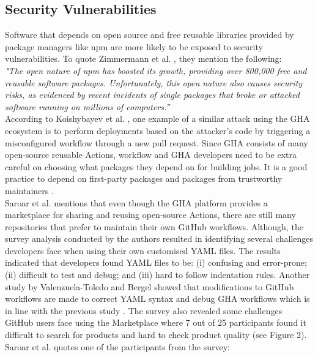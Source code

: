 \documentclass[conference]{IEEEtran}
\begin{document}
    \subsection{Security Vulnerabilities}
        Software that depends on open source and free reusable libraries provided by package managers like npm are more likely to be exposed to security vulnerabilities. To quote Zimmermann et al. \cite{zimmermann2019small}, they mention the following: \\

        \textit{"The open nature of npm has boosted its growth, providing over 800,000 free and reusable software packages. Unfortunately, this open nature also causes security risks, as evidenced by recent incidents of single packages that broke or attacked software running on millions of computers.”} \\

        According to Koishybayev et al. \cite{koishybayev2022characterizing}, one example of a similar attack using the GHA ecosystem is to perform deployments based on the attacker’s code by triggering a misconfigured workflow through a new pull request. Since GHA consists of many open-source reusable Actions, workflow and GHA developers need to be extra careful on choosing what packages they depend on for building jobs. It is a good practice to depend on first-party packages and packages from trustworthy maintainers \cite{zimmermann2019small}. \\

        Saroar et al. \cite{saroar2023developers} mentions that even though the GHA platform provides a marketplace for sharing and reusing open-source Actions, there are still many repositories that prefer to maintain their own GitHub workflows. Although, the survey analysis conducted by the authors resulted in identifying several challenges developers face when using their own customised YAML files.  The results indicated that developers found YAML files to be: (i) confusing and error-prone; (ii) difficult to test and debug; and (iii) hard to follow indentation rules. Another study by Valenzuela-Toledo and Bergel \cite{valenzuela2022evolution}  showed that modifications to GitHub workflows are made to correct YAML syntax and debug GHA workflows which is in line with the previous study \cite{saroar2023developers}. The survey also revealed some challenges GitHub users face using the Marketplace where 7 out of 25 participants found it difficult to search for products and hard to check product quality (see Figure 2). Saroar et al. \cite{saroar2023developers} quotes one of the participants from the survey: \\
\end{document}
